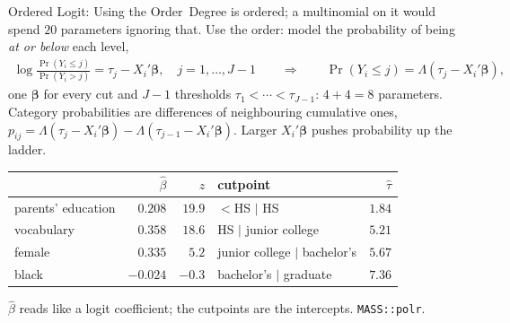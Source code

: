 \documentclass[aspectratio=169,11pt,xcolor=dvipsnames]{beamer}
\newcommand{\core}{\,\raisebox{0.6pt}{\textcolor{corestar}{$\bigstar$}}}
\begin{document}
\begin{frame}{Ordered Logit: Using the Order\core}
Degree is ordered; a multinomial on it would spend $20$ parameters
ignoring that. Use the order: model the probability of being \emph{at or
below} each level,
\begingroup
\setlength{\abovedisplayskip}{2pt}\setlength{\belowdisplayskip}{2pt}
\begin{align*}
  \log\frac{\Pr(Y_i \le j)}{\Pr(Y_i > j)} = \tau_j - X_i'\bm\beta,
  \quad j = 1, \dots, J-1
  \qquad\Longrightarrow\qquad
  \Pr(Y_i \le j) = \Lambda(\tau_j - X_i'\bm\beta),
\end{align*}
\endgroup
one $\bm\beta$ for every cut and $J - 1$ thresholds $\tau_1 < \cdots <
\tau_{J-1}$: $4 + 4 = 8$ parameters. Category probabilities are
differences of neighbouring cumulative ones, $p_{ij} = \Lambda(\tau_j -
X_i'\bm\beta) - \Lambda(\tau_{j-1} - X_i'\bm\beta)$. Larger $X_i'\bm\beta$
pushes probability up the ladder.
\begin{center}\small
\renewcommand{\arraystretch}{1.0}
\begin{tabular}{lrr@{\qquad}lr}
\toprule
 & $\hat\beta$ & $z$ & cutpoint & $\hat\tau$ \\
\midrule
parents' education & $0.208$ & $19.9$ & $<$HS $\mid$ HS & $1.84$ \\
vocabulary & $0.358$ & $18.6$ & HS $\mid$ junior college & $5.21$ \\
female & $0.335$ & $5.2$ & junior college $\mid$ bachelor's & $5.67$ \\
black & $-0.024$ & $-0.3$ & bachelor's $\mid$ graduate & $7.36$ \\
\bottomrule
\end{tabular}
\end{center}
$\hat\beta$ reads like a logit coefficient; the cutpoints are the
intercepts. \texttt{MASS::polr}.
\end{frame}
\end{document}
